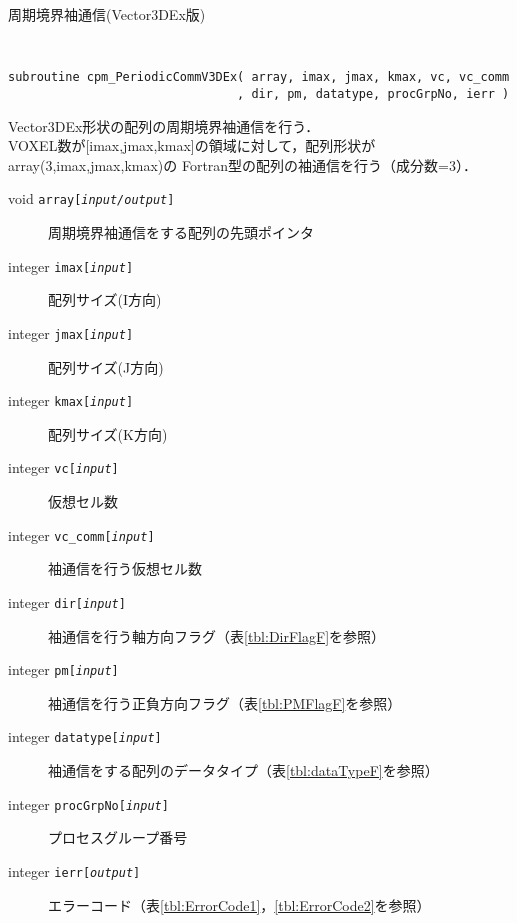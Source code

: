 \begin{spacing}{0.8}
\begin{itembox}[l]{周期境界袖通信(Vector3DEx版)}
{\tt
\begin{verbatim}
subroutine cpm_PeriodicCommV3DEx( array, imax, jmax, kmax, vc, vc_comm
                                , dir, pm, datatype, procGrpNo, ierr )
\end{verbatim}
}
Vector3DEx形状の配列の周期境界袖通信を行う．\\
VOXEL数が[imax,jmax,kmax]の領域に対して，配列形状がarray(3,imax,jmax,kmax)の
Fortran型の配列の袖通信を行う（成分数=3）．
\begin{description}
\item[void    {\tt array[{\it input/output}]}] 周期境界袖通信をする配列の先頭ポインタ
\item[integer {\tt imax[{\it input}]}] 配列サイズ(I方向)
\item[integer {\tt jmax[{\it input}]}] 配列サイズ(J方向)
\item[integer {\tt kmax[{\it input}]}] 配列サイズ(K方向)
\item[integer {\tt vc[{\it input}]}] 仮想セル数
\item[integer {\tt vc\_comm[{\it input}]}] 袖通信を行う仮想セル数
\item[integer {\tt dir[{\it input}]}] 袖通信を行う軸方向フラグ（表\ref{tbl:DirFlagF}を参照）
\item[integer {\tt pm[{\it input}]}] 袖通信を行う正負方向フラグ（表\ref{tbl:PMFlagF}を参照）
\item[integer {\tt datatype[{\it input}]}] 袖通信をする配列のデータタイプ（表\ref{tbl:dataTypeF}を参照）
\item[integer {\tt procGrpNo[{\it input}]}] プロセスグループ番号
\item[integer {\tt ierr[{\it output}]}] エラーコード（表\ref{tbl:ErrorCode1}，\ref{tbl:ErrorCode2}を参照）
\end{description}
\end{itembox}\\
\end{spacing}

